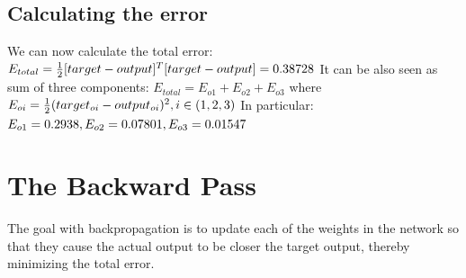 \documentclass[12pt]{article}
\begin{document}
\subsection{Calculating the error}
We can now calculate the total error:
\begin{math}
\newline\newline
E_{total} = \frac{1}{2} [target - output]^{T}[target - output] = 0.38728\newline\newline
\end{math}
It can be also seen as sum of three components: 
\begin{math}
E_{total} = E_{o1} + E_{o2} + E_{o3}
\end{math}
where
\begin{math}
E_{oi} = \frac{1}{2} (target_{oi} - output_{oi})^{2}, i \in (1,2,3)\newline
\end{math}
In particular:
\begin{math}
\newline\newline
E_{o1} = 0.2938, E_{o2} = 0.07801, E_{o3} = 0.01547
\end{math}
\section{The Backward Pass}
The goal with backpropagation is to update each of the weights in the network so that they cause the actual output to be closer the target output, thereby minimizing the total error.
\end{document}
